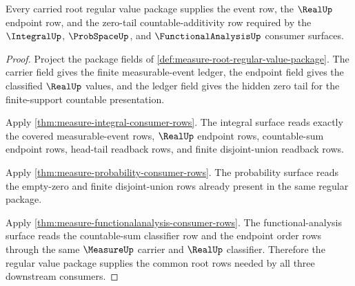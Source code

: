 \begin{theorem}
\label{thm:measure-root-regular-value-downstream-package}
Every carried root regular value package supplies the event row, the
$\RealUp$ endpoint row, and the zero-tail countable-additivity row required by
the $\IntegralUp$, $\ProbSpaceUp$, and $\FunctionalAnalysisUp$ consumer
surfaces.
\end{theorem}
\begin{proof}
Project the package fields of
\autoref{def:measure-root-regular-value-package}. The carrier field gives the
finite measurable-event ledger, the endpoint field gives the classified
$\RealUp$ values, and the ledger field gives the hidden zero tail for the
finite-support countable presentation.

Apply \autoref{thm:measure-integral-consumer-rows}. The integral surface
reads exactly the covered measurable-event rows, $\RealUp$ endpoint rows,
countable-sum endpoint rows, head-tail readback rows, and finite
disjoint-union readback rows.

Apply \autoref{thm:measure-probability-consumer-rows}. The probability
surface reads the empty-zero and finite disjoint-union rows already present in
the same regular package.

Apply \autoref{thm:measure-functionalanalysis-consumer-rows}. The
functional-analysis surface reads the countable-sum classifier row and the
endpoint order rows through the same $\MeasureUp$ carrier and $\RealUp$
classifier. Therefore the regular value package supplies the common root rows
needed by all three downstream consumers.
\end{proof}

